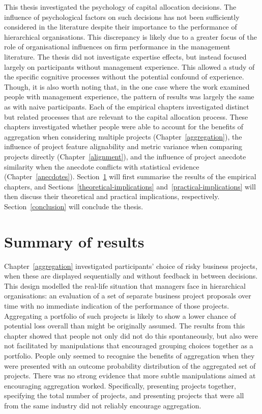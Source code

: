 \documentclass[a4paper, nobind, dvipsnames]{templates/ociamthesis}
\theoremstyle{definition}
\theoremstyle{definition}
\theoremstyle{definition}
\theoremstyle{definition}
\theoremstyle{remark}
\begin{document}
This thesis investigated the psychology of capital allocation decisions. The
influence of psychological factors on such decisions has not been sufficiently
considered in the literature despite their importance to the performance of
hierarchical organisations. This discrepancy is likely due to a greater focus of
the role of organisational influences on firm performance in the management
literature. The thesis did not investigate expertise effects, but instead
focused largely on participants without management experience. This allowed a
study of the specific cognitive processes without the potential confound of
experience. Though, it is also worth noting that, in the one case where the work
examined people with management experience, the pattern of results was largely
the same as with naive participants. Each of the empirical chapters investigated
distinct but related processes that are relevant to the capital allocation
process. These chapters investigated whether people were able to account for the
benefits of aggregation when considering multiple projects
(Chapter~\ref{aggregation}), the influence of project feature alignability and
metric variance when comparing projects directly (Chapter~\ref{alignment}), and
the influence of project anecdote similarity when the anecdote conflicts with
statistical evidence (Chapter~\ref{anecdotes}).
Section~\ref{summary-of-results} will first summarise the results of the
empirical chapters, and Sections~\ref{theoretical-implications}
and~\ref{practical-implications} will then discuss their theoretical and
practical implications, respectively. Section~\ref{conclusion} will conclude
the thesis.

\hypertarget{summary-of-results}{%
\section{Summary of results}\label{summary-of-results}}

Chapter~\ref{aggregation} investigated participants' choice of risky business
projects, when these are displayed sequentially and without feedback in between
decisions. This design modelled the real-life situation that managers face in
hierarchical organisations: an evaluation of a set of separate business project
proposals over time with no immediate indication of the performance of those
projects. Aggregating a portfolio of such projects is likely to show a lower
chance of potential loss overall than might be originally assumed. The results
from this chapter showed that people not only did not do this spontaneously, but
also were not facilitated by manipulations that encouraged grouping choices
together as a portfolio. People only seemed to recognise the benefits of
aggregation when they were presented with an outcome probability distribution of
the aggregated set of projects. There was no strong evidence that more subtle
manipulations aimed at encouraging aggregation worked. Specifically, presenting
projects together, specifying the total number of projects, and presenting
projects that were all from the same industry did not reliably encourage
aggregation.
\end{document}
